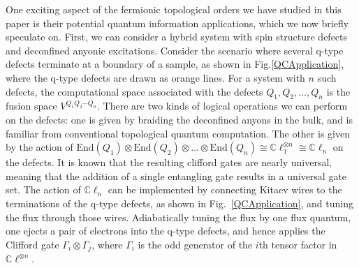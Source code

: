 \documentclass[12pt,a4paper]{article}
\newcommand{\tp}{\otimes}
\newcommand{\End}{\text{End}}
\newcommand{\cl}{\mathbb{C}\ell}
\newcommand{\dave}[1]{{\color{ao(english)}\footnotesize{(DA) #1}}}
\newcommand{\ethan}[1]{{\color{amethyst}\footnotesize{(EL) #1}}}
\begin{document}
One exciting aspect of the fermionic topological orders we have studied in this paper is their potential quantum information 
applications, which we now briefly speculate on. 
First, we can consider a hybrid system with spin structure defects and deconfined anyonic excitations.
Consider the scenario where several q-type defects terminate at a boundary of a sample, as shown in Fig.\ref{QCApplication}, where the q-type defects are drawn as orange lines.
For a system with $n$ such defects,  
the computational space associated with the defects $Q_1,Q_2,\dots,Q_n$ is the fusion space $V^{Q_1 Q_2 \cdots Q_n}$. 
There are two kinds of logical operations we can perform on the defects:
one is given by braiding the deconfined anyons in the bulk, and is familiar from conventional topological quantum computation.
The other is given by the action of $\End(Q_1)\tp\End(Q_2)\tp\dots\tp\End(Q_n)\cong\cl_1^{\tp n} \cong \cl_n$ on the defects.
It is known that the resulting clifford gates are nearly universal, meaning that the addition of a single entangling gate results in a universal gate set.
The action of $\cl_n$ can be implemented by connecting Kitaev wires to the terminations of the q-type defects, as shown in Fig.~\ref{QCApplication}, and tuning the flux through those wires. 
Adiabatically tuning the flux by one flux quantum, one ejects a pair of electrons into the q-type defects, and hence applies the Clifford gate $\Gamma_i \tp \Gamma_j$, where $\Gamma_i$ is the odd generator 
of the $i$th tensor factor in $\cl^{\tp n}$.
\end{document}
